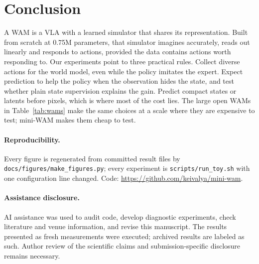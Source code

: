 \documentclass[11pt]{article}
\newcommand{\code}[1]{\texttt{#1}}
\begin{document}
\section{Conclusion}

A WAM is a VLA with a learned simulator that shares its representation. Built from scratch at 0.75M parameters, that simulator imagines accurately, reads out linearly and responds to actions, provided the data contains actions worth responding to. Our experiments point to three practical rules. Collect diverse actions for the world model, even while the policy imitates the expert. Expect prediction to help the policy when the observation hides the state, and test whether plain state supervision explains the gain. Predict compact states or latents before pixels, which is where most of the cost lies. The large open WAMs in Table~\ref{tab:wams} make the same choices at a scale where they are expensive to test; mini-WAM makes them cheap to test.

\paragraph{Reproducibility.} Every figure is regenerated from committed result files by \code{docs/figures/make\_figures.py}; every experiment is \code{scripts/run\_toy.sh} with one configuration line changed. Code: \url{https://github.com/keivalya/mini-wam}.

\paragraph{Assistance disclosure.}
AI assistance was used to audit code, develop diagnostic experiments, check literature and venue information, and revise this manuscript. The results presented as fresh measurements were executed; archived results are labeled as such. Author review of the scientific claims and submission-specific disclosure remains necessary.
\end{document}
